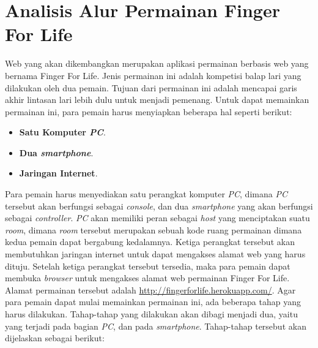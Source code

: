 \section{Analisis Alur Permainan Finger For Life}
\label{alur}

Web yang akan dikembangkan merupakan aplikasi permainan berbasis web yang bernama Finger For Life. Jenis permainan ini adalah kompetisi balap lari yang dilakukan oleh dua pemain. Tujuan dari permainan ini adalah mencapai garis akhir lintasan lari lebih dulu untuk menjadi pemenang. Untuk dapat memainkan permainan ini, para pemain harus menyiapkan beberapa hal seperti berikut:

\begin{itemize}
	\item \textbf{Satu Komputer \textit{PC}}.
	\item \textbf{Dua \textit{smartphone}}.
	\item \textbf{Jaringan Internet}.
\end{itemize}

Para pemain harus menyediakan satu perangkat komputer \textit{PC}, dimana \textit{PC} tersebut akan berfungsi sebagai \textit{console}, dan dua \textit{smartphone} yang akan berfungsi sebagai \textit{controller}. \textit{PC} akan memiliki peran sebagai \textit{host} yang menciptakan suatu \textit{room}, dimana \textit{room} tersebut merupakan sebuah kode ruang permainan dimana kedua pemain dapat bergabung kedalamnya. Ketiga perangkat tersebut akan membutuhkan jaringan internet untuk dapat mengakses alamat web yang harus dituju. Setelah ketiga perangkat tersebut tersedia, maka para pemain dapat membuka \textit{browser} untuk mengakses alamat web permainan Finger For Life. Alamat permainan tersebut adalah \url{http://fingerforlife.herokuapp.com/}. Agar para pemain dapat mulai memainkan permainan ini, ada beberapa tahap yang harus dilakukan. Tahap-tahap yang dilakukan akan dibagi menjadi dua, yaitu yang terjadi pada bagian \textit{PC}, dan pada \textit{smartphone}. Tahap-tahap tersebut akan dijelaskan sebagai berikut:


